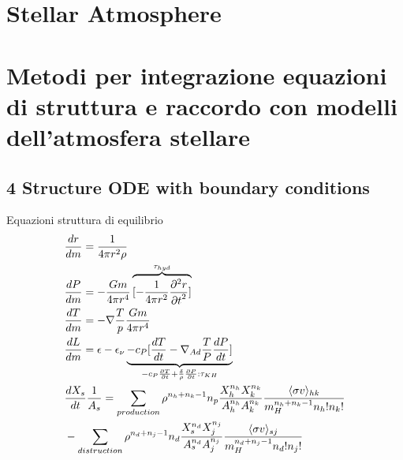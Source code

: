 \section{Stellar Atmosphere}


\section{Metodi per integrazione equazioni di struttura e raccordo con modelli dell'atmosfera stellare}

\subsection{4 Structure ODE with boundary conditions}

\begin{frame}{Equazioni struttura di equilibrio}
\begin{align*}
&\TDy{m}{r}=\frac{1}{4\pi r^2\rho}\\
&\TDy{m}{P}=-\frac{Gm}{4\pi r^4}\overbrace{[-\frac{1}{4\pi r^2}\PtwoDy{t}{r}]}^{\tau_{hyd}}\\
&\TDy{m}{T}=-\nabla\frac{T}{p}\frac{Gm}{4\pi r^4}\\
&\TDy{m}{L}=\epsilon-\epsilon_{\nu} \underbrace{-c_P[\TDy{t}{T}-\nad\frac{T}{P}\TDy{t}{P}]}_{-c_P\PDy{t}{T}+\frac{\delta}{\rho}\PDy{t}{P}: \tkh}\\
&\TDy{t}{X_s}\frac{1}{A_s}=\sum_{production}\rho^{n_h+n_k-1}n_p\frac{X_h^{n_h}X_k^{n_k}}{A_h^{n_h}A_k^{n_k}}\frac{\exv{\sigma v}_{hk}}{m_H^{n_h+n_k-1}n_h!n_k!}\\
&-\sum_{distruction}\rho^{n_d+n_j-1}n_d\frac{X_s^{n_d}X_j^{n_j}}{A_s^{n_d}A_j^{n_j}}\frac{\exv{\sigma v}_{sj}}{m_H^{n_d+n_j-1}n_d!n_j!}
\end{align*}
\end{frame}

